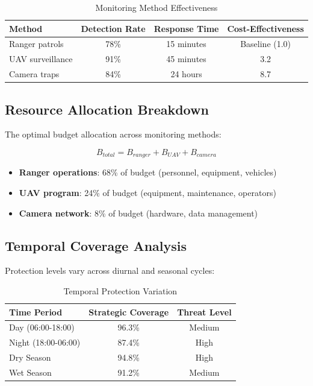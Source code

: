 \begin{table}[h]
\centering
\caption{Monitoring Method Effectiveness}
\begin{tabular}{lccc}
\hline
\textbf{Method} & \textbf{Detection Rate} & \textbf{Response Time} & \textbf{Cost-Effectiveness} \\
\hline
Ranger patrols & 78\% & 15 minutes & Baseline (1.0) \\
UAV surveillance & 91\% & 45 minutes & 3.2 \\
Camera traps & 84\% & 24 hours & 8.7 \\
\hline
\end{tabular}
\end{table}

\subsection{Resource Allocation Breakdown}

The optimal budget allocation across monitoring methods:

\begin{equation}
B_{total} = B_{ranger} + B_{UAV} + B_{camera}
\label{eq:budget}
\end{equation}

\begin{itemize}
    \item \textbf{Ranger operations}: 68\% of budget (personnel, equipment, vehicles)
    \item \textbf{UAV program}: 24\% of budget (equipment, maintenance, operators)
    \item \textbf{Camera network}: 8\% of budget (hardware, data management)
\end{itemize}

\subsection{Temporal Coverage Analysis}

Protection levels vary across diurnal and seasonal cycles:

\begin{table}[h]
\centering
\caption{Temporal Protection Variation}
\begin{tabular}{lcc}
\hline
\textbf{Time Period} & \textbf{Strategic Coverage} & \textbf{Threat Level} \\
\hline
Day (06:00-18:00) & 96.3\% & Medium \\
Night (18:00-06:00) & 87.4\% & High \\
Dry Season & 94.8\% & High \\
Wet Season & 91.2\% & Medium \\
\hline
\end{tabular}
\end{table}


